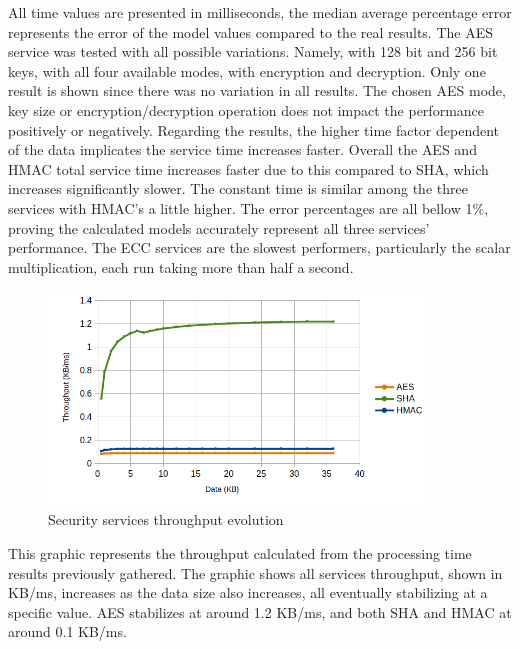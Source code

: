 

All time values are presented in milliseconds, the median average percentage error represents the error of the model values compared to the real results.
The \ac{AES} service was tested with all possible variations. Namely, with 128 bit and 256 bit keys, with all four available modes, with encryption and decryption. Only one result is shown since there was no variation in all results. The chosen \ac{AES} mode, key size or encryption/decryption operation does not impact the performance positively or negatively.
Regarding the results, the higher time factor dependent of the data implicates the service time increases faster. Overall the \ac{AES} and \ac{HMAC} total service time increases faster due to this compared to \ac{SHA}, which increases significantly slower. The constant time is similar among the three services with \ac{HMAC}'s a little higher.
The error percentages are all bellow 1\%, proving the calculated models accurately represent all three services' performance.
The \ac{ECC} services are the slowest performers, particularly the scalar multiplication, each run taking more than half a second.

\begin{figure}[h!]
	\centering
	\includegraphics[width=0.9\textwidth]{./Images/core-tput.png}
	\caption{Security services throughput evolution}
	\label{fig:performance:core-tput}
\end{figure}

This graphic represents the throughput calculated from the processing time results previously gathered. The graphic shows all services throughput, shown in KB/ms, increases as the data size also increases, all eventually stabilizing at a specific value. \ac{AES} stabilizes at around 1.2 KB/ms, and both \ac{SHA} and \ac{HMAC} at around 0.1 KB/ms.

